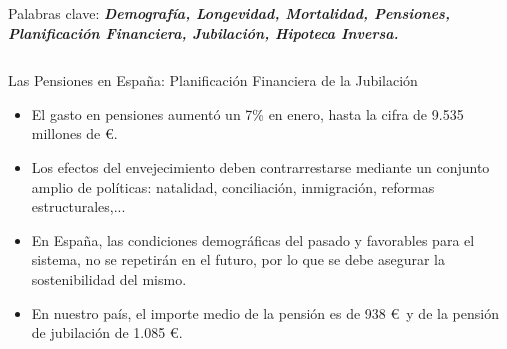 \documentclass[]{beamer}
\begin{document}
\begin{frame}{\vspace{1ex}\hfill Palabras clave: \bfseries \textit{Demograf\'ia, Longevidad, Mortalidad, Pensiones, Planificaci\'on Financiera, Jubilaci\'on, Hipoteca Inversa.}}
\begin{columns}[t]
\begin{block}{Las Pensiones en Espa\~na: Planificaci\'on Financiera de la Jubilaci\'on}
\begin{multicols}{2}
\begin{itemize}
						\item El gasto en pensiones aument\'o un 7\% en enero, hasta la cifra de 9.535 millones de \euro.
						\item Los efectos del envejecimiento deben contrarrestarse mediante un conjunto amplio de pol\'iticas: natalidad, conciliaci\'on, inmigraci\'on, reformas estructurales,...
						\item En Espa\~na, las condiciones demogr\'aficas del pasado y favorables para el sistema, no se repetir\'an en el futuro, por lo que se debe asegurar la sostenibilidad del mismo.
						\item En nuestro pa\'is, el importe medio de la pensi\'on es de 938 \euro\ y de la pensi\'on de jubilaci\'on de 1.085 \euro.						
					\end{itemize}
			\end{multicols}
			\vspace{-2.5cm}
			\begin{columns}[t]
					\begin{figure}[h]

\end{figure}
\end{columns}
\end{block}
\end{columns}
\end{frame}
\end{document}
